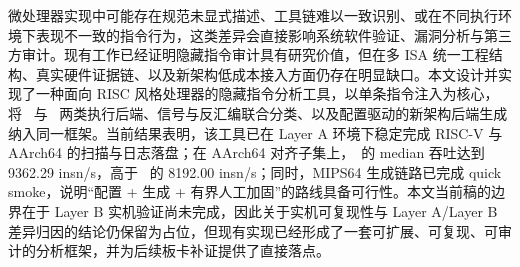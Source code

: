 微处理器实现中可能存在规范未显式描述、工具链难以一致识别、或在不同执行环境下表现不一致的指令行为，这类差异会直接影响系统软件验证、漏洞分析与第三方审计。现有工作已经证明隐藏指令审计具有研究价值，但在多 ISA 统一工程结构、真实硬件证据链、以及新架构低成本接入方面仍存在明显缺口。本文设计并实现了一种面向 RISC 风格处理器的隐藏指令分析工具，以单条指令注入为核心，将 \memcage\ 与 \ptracebackend\ 两类执行后端、信号与反汇编联合分类、以及配置驱动的新架构后端生成纳入同一框架。当前结果表明，该工具已在 Layer A 环境下稳定完成 RISC-V 与 AArch64 的扫描与日志落盘；在 AArch64 对齐子集上，\memcage\ 的 median 吞吐达到 9362.29 insn/s，高于 \ptracebackend\ 的 8192.00 insn/s；同时，MIPS64 生成链路已完成 quick smoke，说明“配置 + 生成 + 有界人工加固”的路线具备可行性。本文当前稿的边界在于 Layer B 实机验证尚未完成，因此关于实机可复现性与 Layer A/Layer B 差异归因的结论仍保留为占位，但现有实现已经形成了一套可扩展、可复现、可审计的分析框架，并为后续板卡补证提供了直接落点。
